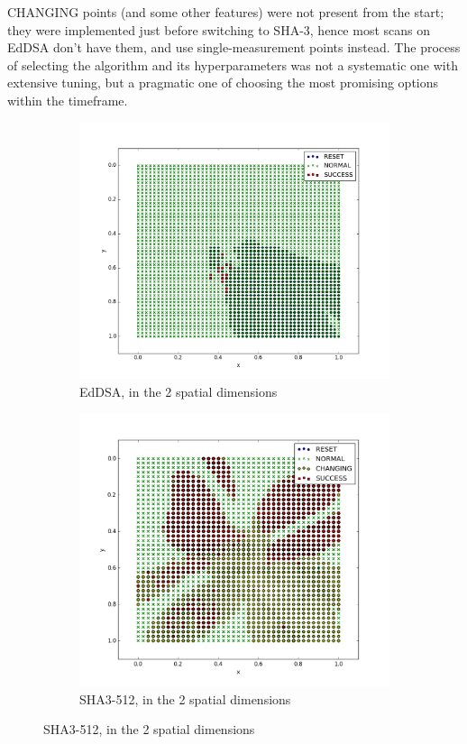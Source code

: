\documentclass[times, utf8, diplomski]{fer}
\begin{document}
CHANGING points (and some other features) were not present from the start;
they were implemented just before switching to SHA-3, hence most scans on EdDSA
don't have them, and use single-measurement points instead. The process of
selecting the algorithm and its hyperparameters was not a systematic one
with extensive tuning, but a pragmatic one of choosing the most promising
options within the timeframe.

\begin{figure}[htbp]
    \centering
    \begin{subfigure}[b]{0.48\textwidth}
        \includegraphics[width=0.95\linewidth]{images/plots/EdDSA_space_all_2D.png}
        \caption{EdDSA, in the 2 spatial dimensions}
    \end{subfigure}
    \hspace{8pt}
    \begin{subfigure}[b]{0.48\textwidth}
        \includegraphics[width=0.95\linewidth]{images/plots/Keccak_space_all_2D.png}
        \caption{SHA3-512, in the 2 spatial dimensions}
    \end{subfigure}


\end{figure}
\end{document}
